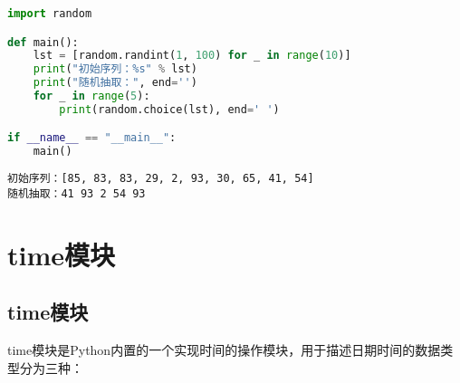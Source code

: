 
\begin{lstlisting}[language=Python]
import random

def main():
    lst = [random.randint(1, 100) for _ in range(10)]
    print("初始序列：%s" % lst)
    print("随机抽取：", end='')
    for _ in range(5):
        print(random.choice(lst), end=' ')

if __name__ == "__main__":
    main()
\end{lstlisting}

\begin{tcolorbox}
	\begin{verbatim}
初始序列：[85, 83, 83, 29, 2, 93, 30, 65, 41, 54]
随机抽取：41 93 2 54 93
\end{verbatim}
\end{tcolorbox}

\newpage

\section{time模块}

\subsection{time模块}

time模块是Python内置的一个实现时间的操作模块，用于描述日期时间的数据类型分为三种：
